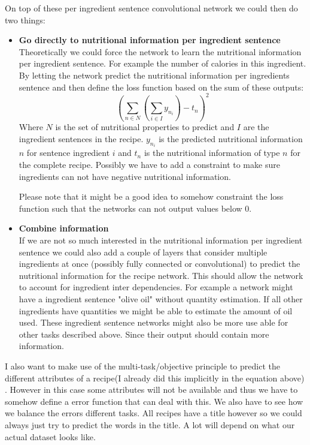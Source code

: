 \documentclass[a4paper]{scrartcl}
\begin{document}
On top of these per ingredient sentence convolutional network we could then do two things:
\begin{itemize}
\item \textbf{Go directly to nutritional information per ingredient sentence}\\ Theoretically we could force the network to learn the nutritional information per ingredient sentence. For example the number of calories in this ingredient. By letting the network predict the nutritional information per ingredients sentence and then define the loss function based on the sum of these outputs: 
$$ (\sum_{n \in N}(\sum_{i \in I} y_n_i) - t_n)^2 $$
Where $N$ is the set of nutritional properties to predict and $I$ are the ingredient sentences in the recipe. $y_n_i$ is the predicted nutritional information $n$ for sentence ingredient $i$ and $t_n$ is the nutritional information of type $n$ for the complete recipe. Possibly we have to add a constraint to make sure ingredients can not have negative nutritional information. 

Please note that it might be a good idea to somehow constraint the loss function such that the networks can not output values below 0. 

\item \textbf{Combine information}\\ If we are not so much interested in the nutritional information per ingredient sentence we could also add a couple of layers that consider multiple ingredients at once (possibly fully connected or convolutional) to predict the nutritional information for the recipe network. This should allow the network to account for ingredient inter dependencies. For example a network might have a ingredient sentence "olive oil" without quantity estimation. If all other ingredients have quantities we might be able to estimate the amount of oil used. These ingredient sentence networks might also be more use able for other tasks described above. Since their output should contain more information.
\end{itemize}

I also want to make use of the multi-task/objective principle to predict the different attributes of a recipe(I already did this implicitly in the equation above) . However in this case some attributes will not be available and thus we have to somehow define a error function that can deal with this. We also have to see how we balance the errors different tasks. All recipes have a title however so we could always just try to predict the words in the title. A lot will depend on what our actual dataset looks like. 
\end{document}
